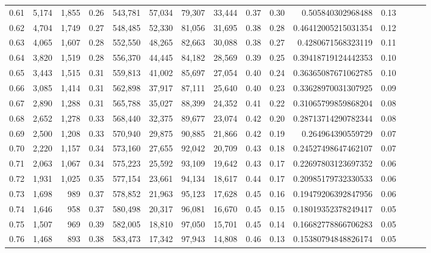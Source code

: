 \begin{tabular}{rrrrrrrrrrrrrrr}
0.61 &   5,174 &  1,855 &  0.26 &  543,781 &   57,034 &   79,307 &   33,444 &  0.37 &  0.30 &     0.505840302968488 &      0.13 \\
0.62 &   4,704 &  1,749 &  0.27 &  548,485 &   52,330 &   81,056 &   31,695 &  0.38 &  0.28 &   0.46412005215031354 &      0.12 \\
0.63 &   4,065 &  1,607 &  0.28 &  552,550 &   48,265 &   82,663 &   30,088 &  0.38 &  0.27 &    0.4280671568323119 &      0.11 \\
0.64 &   3,820 &  1,519 &  0.28 &  556,370 &   44,445 &   84,182 &   28,569 &  0.39 &  0.25 &   0.39418719124442353 &      0.10 \\
0.65 &   3,443 &  1,515 &  0.31 &  559,813 &   41,002 &   85,697 &   27,054 &  0.40 &  0.24 &   0.36365087671062785 &      0.10 \\
0.66 &   3,085 &  1,414 &  0.31 &  562,898 &   37,917 &   87,111 &   25,640 &  0.40 &  0.23 &   0.33628970031307925 &      0.09 \\
0.67 &   2,890 &  1,288 &  0.31 &  565,788 &   35,027 &   88,399 &   24,352 &  0.41 &  0.22 &   0.31065799859868204 &      0.08 \\
0.68 &   2,652 &  1,278 &  0.33 &  568,440 &   32,375 &   89,677 &   23,074 &  0.42 &  0.20 &   0.28713714290782344 &      0.08 \\
0.69 &   2,500 &  1,208 &  0.33 &  570,940 &   29,875 &   90,885 &   21,866 &  0.42 &  0.19 &     0.264964390559729 &      0.07 \\
0.70 &   2,220 &  1,157 &  0.34 &  573,160 &   27,655 &   92,042 &   20,709 &  0.43 &  0.18 &   0.24527498647462107 &      0.07 \\
0.71 &   2,063 &  1,067 &  0.34 &  575,223 &   25,592 &   93,109 &   19,642 &  0.43 &  0.17 &   0.22697803123697352 &      0.06 \\
0.72 &   1,931 &  1,025 &  0.35 &  577,154 &   23,661 &   94,134 &   18,617 &  0.44 &  0.17 &   0.20985179732330533 &      0.06 \\
0.73 &   1,698 &    989 &  0.37 &  578,852 &   21,963 &   95,123 &   17,628 &  0.45 &  0.16 &   0.19479206392847956 &      0.06 \\
0.74 &   1,646 &    958 &  0.37 &  580,498 &   20,317 &   96,081 &   16,670 &  0.45 &  0.15 &   0.18019352378249417 &      0.05 \\
0.75 &   1,507 &    969 &  0.39 &  582,005 &   18,810 &   97,050 &   15,701 &  0.45 &  0.14 &   0.16682778866706283 &      0.05 \\
0.76 &   1,468 &    893 &  0.38 &  583,473 &   17,342 &   97,943 &   14,808 &  0.46 &  0.13 &   0.15380794848826174 &      0.05 \\

\end{tabular}
